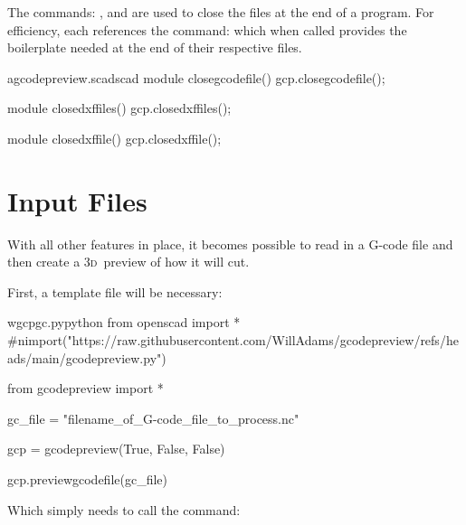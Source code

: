 \documentclass{ltxdoc}
\begin{document}
The commands: , and  are used to close the files at the end of a program. For efficiency, each references the command:  which when called provides the boilerplate needed at the end of their respective files.

\lstset{firstnumber=\thegcpscad}
\begin{writecode}{a}{gcodepreview.scad}{scad}
module closegcodefile(){
    gcp.closegcodefile();
}

module closedxffiles(){
    gcp.closedxffiles();
}

module closedxffile(){
    gcp.closedxffile();
}

\end{writecode}
\addtocounter{gcpscad}{12}

\section*{Input Files}

With all other features in place, it becomes possible to read in a G-code file and then create a \textsc{3d}~preview of how it will cut. 

First, a template file will be necessary:

\lstset{firstnumber=1}%
\begin{writecode}{w}{gcpgc.py}{python}
from openscad import *
#nimport("https://raw.githubusercontent.com/WillAdams/gcodepreview/refs/heads/main/gcodepreview.py")

from gcodepreview import *

gc_file = "filename_of_G-code_file_to_process.nc"

gcp = gcodepreview(True, False, False)

gcp.previewgcodefile(gc_file)

\end{writecode}

\noindent Which simply needs to call the  command:
\end{document}
